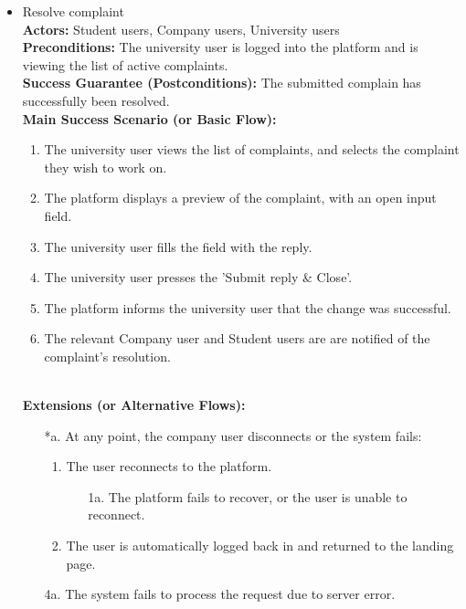 \begin{itemize}[label={[\textbf{UC}]}, align=left, leftmargin=*]
    \item {} Resolve complaint \\
    \textbf{Actors:} Student users, Company users, University users\\
     \textbf{Preconditions:} The university user is logged into the platform and is viewing the list of active complaints.\\
     \textbf{Success Guarantee (Postconditions):} The submitted complain has successfully been resolved. \\
     \textbf{Main Success Scenario (or Basic Flow):} 
     \begin{enumerate}[label=\arabic*.] 
        \item The university user views the list of complaints, and selects the complaint they wish to work on.
        \item The platform displays a preview of the complaint, with an open input field.
        \item The university user fills the field with the reply.
        \item The university user presses the 'Submit reply \& Close'.
        \item The platform informs the university user that the change was successful.
        \item The relevant Company user and Student users are are notified of the complaint's resolution.
     \end{enumerate} \\

    \textbf{Extensions (or Alternative Flows):} 
    \begin{enumerate}[label=\arabic*.]
        \item[*a.] At any point, the company user disconnects or the system fails:
            \begin{enumerate}[label=\arabic*.]
                \item The user reconnects to the platform.
                    \begin{enumerate}[label=\alph*.]
                        \item[1a.] The platform fails to recover, or the user is unable to reconnect.
                    \end{enumerate}
                 \item The user is automatically logged back in and returned to the landing page.
            \end{enumerate} 
        \item[4a.] The system fails to process the request due to server error.
        \end{enumerate}

\end{itemize}

